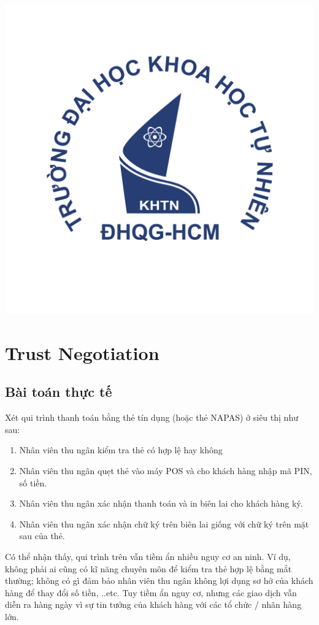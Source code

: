 \documentclass[12pt]{article}
\begin{document}
\begin{titlepage}
\includegraphics[scale=.25]{img/hcmus-logo.png}\\[1cm]

\vfill
\end{titlepage}
	
\tableofcontents
\pagebreak

\section{Trust Negotiation}
\subsection{Bài toán thực tế}
Xét qui trình thanh toán bằng thẻ tín dụng (hoặc thẻ NAPAS) ở siêu thị như sau:
\begin{enumerate}
\item Nhân viên thu ngân kiểm tra thẻ có hợp lệ hay không
\item Nhân viên thu ngân quẹt thẻ vào máy POS và cho khách hàng nhập mã PIN, số tiền.
\item Nhân viên thu ngân xác nhận thanh toán và in biên lai cho khách hàng ký.
\item Nhân viên thu ngân xác nhận chữ ký trên biên lai giống với chữ ký trên mặt sau của thẻ.
\end{enumerate}
Có thể nhận thấy, qui trình trên vẫn tiềm ẩn nhiều nguy cơ an ninh. Ví dụ, không phải ai cũng có kĩ năng chuyên môn để kiểm tra thẻ hợp lệ bằng mắt thường; không có gì đảm bảo nhân viên thu ngân không lợi dụng sơ hở của khách hàng để thay đổi số tiền, ..etc. Tuy tiềm ẩn nguy cơ, nhưng các giao dịch vẫn diễn ra hàng ngày vì sự tin tưởng của khách hàng với các tổ chức / nhãn hàng lớn.
\end{document}
